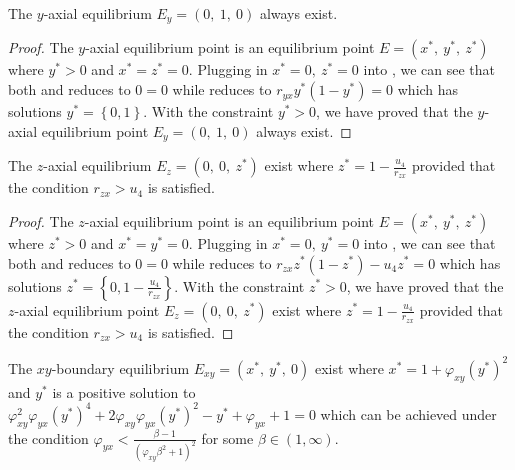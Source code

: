 \begin{theorem}\label{thm:axial-y-exist}
    The $y$-axial equilibrium $E_y=\left(0,\ 1,\ 0\right)$ always exist.
\end{theorem}
\begin{proof}
    The $y$-axial equilibrium point is an equilibrium point $E=\left(x^*,\ y^*,\ z^*\right)$ where $y^*>0$ and $x^*=z^*=0$.
    Plugging in $x^*=0,\ z^*=0$ into , we can see that both  and  reduces to $0=0$ while  reduces to $r_{yx}y^*\left(1-y^*\right)=0$ which has solutions $y^*=\left\{0,1\right\}$.
    With the constraint $y^*>0$, we have proved that the $y$-axial equilibrium point $E_y=\left(0,\ 1,\ 0\right)$ always exist.
\end{proof}
\begin{theorem}\label{thm:axial-z-exist}
    The $z$-axial equilibrium $E_z=\left(0,\ 0,\ z^*\right)$ exist where $z^* = 1-\frac{u_4}{r_{zx}}$ provided that the condition $r_{zx} > u_4$ is satisfied.
\end{theorem}
\begin{proof}
    The $z$-axial equilibrium point is an equilibrium point $E=\left(x^*,\ y^*,\ z^*\right)$ where $z^*>0$ and $x^*=y^*=0$.
    Plugging in $x^*=0,\ y^*=0$ into , we can see that both  and  reduces to $0=0$ while  reduces to $r_{zx}z^*\left(1-z^*\right)-u_4z^*=0$ which has solutions $z^*=\left\{0,1-\frac{u_4}{r_{zx}}\right\}$.
    With the constraint $z^*>0$, we have proved that the $z$-axial equilibrium point $E_z=\left(0,\ 0,\ z^*\right)$ exist where $z^* = 1-\frac{u_4}{r_{zx}}$ provided that the condition $r_{zx} > u_4$ is satisfied.
\end{proof}
\begin{theorem}\label{thm:boundary-xy-exist}
    The $xy$-boundary equilibrium $E_{xy}=\left(x^*,\ y^*,\ 0\right)$ exist where $x^*=1+\varphi_{xy}\left(y^*\right)^2$ and $y^*$ is a positive solution to \\
    $\varphi_{xy}^2\varphi_{yx}\left(y^*\right)^4+2\varphi_{xy}\varphi_{yx}\left(y^*\right)^2-y^*+\varphi_{yx}+1=0$ which can be achieved under the condition $\varphi_{yx}<\frac{\beta-1}{\left(\varphi_{xy}\beta^2+1\right)^2}$ for some $\beta\in\left(1, \infty\right)$.
\end{theorem}
